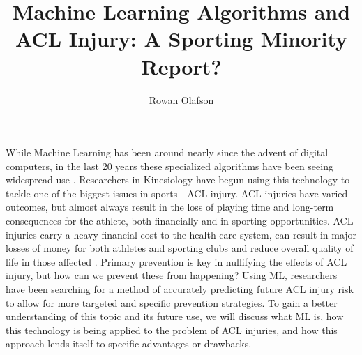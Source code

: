\documentclass[stu,12pt,floatsintext]{apa7}
\title{Machine Learning Algorithms and ACL Injury: A Sporting Minority Report?} %
\author{Rowan Olafson}
\affiliation{University of Calgary}
\begin{document}
\maketitle %


While Machine Learning has been around nearly since the advent of digital computers, in the last 20 years these specialized algorithms have been seeing widespread use \parencite{MLhistory}. Researchers in Kinesiology have begun using this technology to tackle one of the biggest issues in sports - ACL injury. ACL injuries have varied outcomes, but almost always result in the loss of playing time and long-term consequences for the athlete, both financially and in sporting opportunities. ACL injuries carry a heavy financial cost to the health care system, can result in major losses of money for both athletes and sporting clubs and reduce overall quality of life in those affected \parencite{Filbay_2022}. Primary prevention is key in nullifying the effects of ACL injury, but how can we prevent these from happening? Using ML, researchers have been searching for a method of accurately predicting future ACL injury risk to allow for more targeted and specific prevention strategies. To gain a better understanding of this topic and its future use, we will discuss what ML is, how this technology is being applied to the problem of ACL injuries, and how this approach lends itself to specific advantages or drawbacks.
\end{document}
